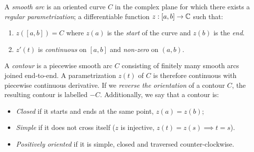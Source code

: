 \begin{defn}{}{}
	A \emph{smooth arc} is an oriented curve $C$ in the complex plane for which there exists a \emph{regular parametrization}; a differentiable function $z:[a,b]\to\mathbb{C}$ such that:\vspace{-2pt}
	\begin{enumerate}\itemsep2pt
	  \item $z([a,b])=C$ where $z(a)$ is the \emph{start} of the curve and $z(b)$ is the \emph{end}.
	  \item $z'(t)$ is \emph{continuous} on $[a,b]$ and \emph{non-zero} on $(a,b)$.
	\end{enumerate}
	A \emph{contour} is a piecewise smooth arc $C$ consisting of finitely many smooth arcs joined end-to-end. A parametrization $z(t)$ of $C$ is therefore continuous with piecewise continuous derivative.\smallbreak
	If we \emph{reverse the orientation} of a contour $C$, the resulting contour is labelled $-C$.\smallbreak
	Additionally, we say that a contour is:\vspace{-2pt}
	\begin{itemize}\itemsep2pt
	  \item \emph{Closed} if it starts and ends at the same point, $z(a)=z(b)$;
	  \item \emph{Simple} if it does not cross itself ($z$ is injective, $z(t)=z(s)\implies t=s$).
	  \item \emph{Positively oriented} if it is simple, closed and traversed counter-clockwise.
	\end{itemize}
\end{defn}

